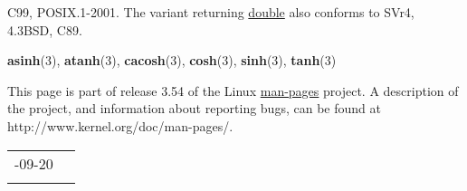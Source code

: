 \documentclass[]{article}
\let\realtextbf=\textbf
\renewcommand{\textbf}[1]{\textcolor{boldcolor}{\realtextbf{#1}}}
\renewcommand{\emph}[1]{\underline{#1}}
\begin{document}
C99, POSIX.1-2001. The variant returning \emph{double} also conforms to
SVr4, 4.3BSD, C89.


\textbf{asinh}(3), \textbf{atanh}(3), \textbf{cacosh}(3),
\textbf{cosh}(3), \textbf{sinh}(3), \textbf{tanh}(3)


This page is part of release 3.54 of the Linux \emph{man-pages} project.
A description of the project, and information about reporting bugs, can
be found at http://www.kernel.org/doc/man-pages/.

\begin{longtable}[c]{@{}ll@{}}
\toprule\addlinespace
2010-09-20 &
\\\addlinespace
\bottomrule
\end{longtable}
\end{document}
